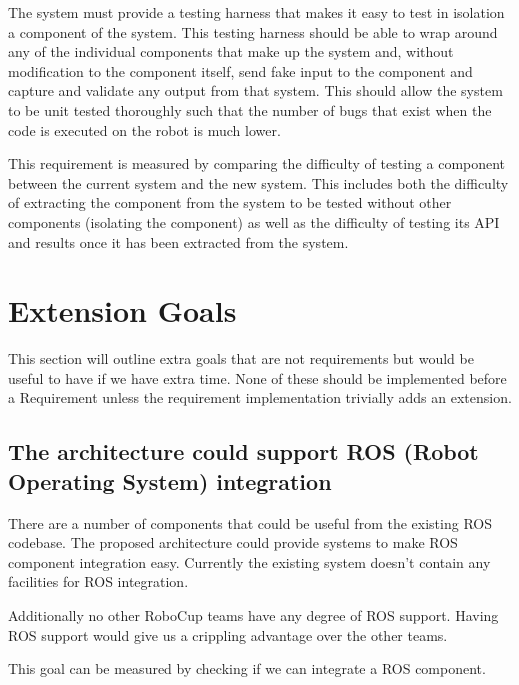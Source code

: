 \documentclass[english,12pt]{scrartcl}
\begin{document}
            The system must provide a testing harness that makes it easy to test in isolation a
            component of the system. This testing harness should be able to wrap around any of the
            individual components that make up the system and, without modification to the component 
            itself, send fake input to the component and capture and validate any output from that
            system. This should allow the system to be unit tested thoroughly such that the number
            of bugs that exist when the code is executed on the robot is much lower.
            
            This requirement is measured by comparing the difficulty of testing a component between
            the current system and the new system. This includes both the difficulty of extracting
            the component from the system to be tested without other components (isolating the
            component) as well as the difficulty of testing its API and results once it has been
            extracted from the system. 
        
    \section{Extension Goals}
        This section will outline extra goals that are not requirements but would be useful to have
        if we have extra time. None of these should be implemented before a Requirement unless the
        requirement implementation trivially adds an extension.
        
        \subsection{The architecture could support ROS (Robot Operating System) integration}
            There are a number of components that could be useful from the existing ROS codebase.
            The proposed architecture could provide systems to make ROS component integration easy.
            Currently the existing system doesn't contain any facilities for ROS integration.
            
            Additionally no other RoboCup teams have any degree of ROS support. Having ROS support
            would give us a crippling advantage over the other teams. 
            
            This goal can be measured by checking if we can integrate a ROS component.
            
\end{document}
